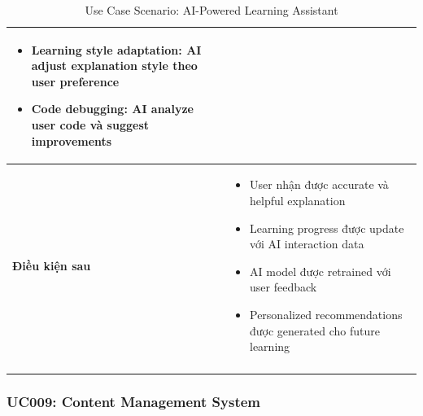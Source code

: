\begin{longtable}{|p{4cm}|p{10cm}|}
\begin{itemize}
    \item Learning style adaptation: AI adjust explanation style theo user preference
    \item Code debugging: AI analyze user code và suggest improvements
\end{itemize} \\ \hline
\textbf{Điều kiện sau} & 
\begin{itemize}
    \item User nhận được accurate và helpful explanation
    \item Learning progress được update với AI interaction data
    \item AI model được retrained với user feedback
    \item Personalized recommendations được generated cho future learning
\end{itemize} \\ \hline
\caption{Use Case Scenario: AI-Powered Learning Assistant}
\label{tab:uc008} \\
\end{longtable}

\subsubsection{UC009: Content Management System}

